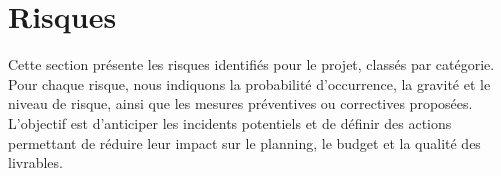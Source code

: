 \section{Risques}
Cette section présente les risques identifiés pour le projet, classés par catégorie. Pour chaque risque, nous indiquons la probabilité d'occurrence, la gravité et le niveau de risque, ainsi que les mesures préventives ou correctives proposées. L'objectif est d'anticiper les incidents potentiels et de définir des actions permettant de réduire leur impact sur le planning, le budget et la qualité des livrables. \\
\begin{center}
\end{center}
